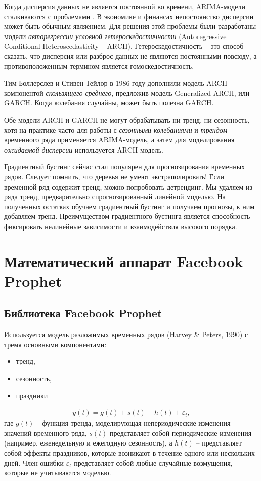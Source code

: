 \documentclass[%
	11pt,
	a4paper,
	utf8,
		]{article}
\begin{document}
Когда дисперсия данных не является постоянной во времени, ARIMA-модели сталкиваются с проблемами \cite[]{gruzdev:time-series-2022}. В экономике и финансах непостоянство дисперсии может быть обычным являением. Для решения этой проблемы были разработаны модели \emph{авторегрессии условной гетероскедостичности} (Autoregressive Conditional Heteroscedasticity -- ARCH). Гетероскедостичность -- это способ сказать, что дисперсия или разброс данных не являются постоянными повсюду, а противоположенным термином является гомоскедостичность.

Тим Боллерслев и Стивен Тейлор в 1986 году дополнили модель ARCH компонентой \emph{скользящего среднего}, предложив модель Generalized ARCH, или GARCH. Когда колебания случайны, может быть полезна GARCH.

{\color{red}Обе модели ARCH и GARCH не могут обрабатывать ни тренд, ни сезонность}, хотя на практике часто для работы с \emph{сезонными колебаниями} и \emph{трендом} временного ряда применяется ARIMA-модель, а затем для моделирования \emph{ожидаемой дисперсии} используется ARCH-модель.

Градиентный бустинг сейчас стал популярен для прогнозирования временных рядов. Следует помнить, что {\color{red}деревья не умеют экстраполировать!} Если временной ряд содержит тренд, можно попробовать детрендинг. Мы удаляем из ряда тренд, предварительно спрогнозированный линейной моделью. На полученных остатках обучаем градиентный бустинг и получаем прогнозы, к ним добавляем тренд. Преимуществом градиентного бустинга является способность фиксировать нелинейные зависимости и взаимодействия высокого порядка.

\section{Математический аппарат Facebook Prophet}

\subsection{Библиотека Facebook Prophet}

Используется модель разложимых временных рядов (Harvey \& Peters, 1990) с тремя основными компонентами:
\begin{itemize}
	\item тренд,
	
	\item сезонность,
	
	\item праздники
\end{itemize}
\begin{align*}
y(t) = g(t) + s(t) + h(t) + \varepsilon_t,
\end{align*}
где $g(t)$ -- функция тренда, моделирующая непериодические изменения значений временного ряда, $s(t)$ представляет собой периодические изменения (например, еженедельную и ежегодную сезонность), а $h(t)$ -- представляет собой эффекты праздников, которые возникают в течение одного или нескольких дней. Член ошибки $\varepsilon_t$ представляет собой любые случайные возмущения, которые не учитываются моделью. 
\end{document}
